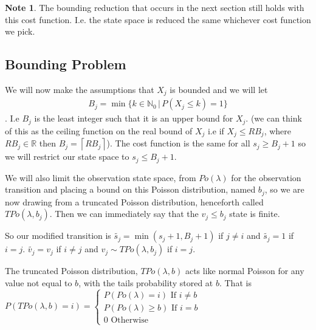 \documentclass[a4paper,10pt]{article}
\newcommand{\ceil}[1]{\left \lceil #1 \right \rceil}
\theoremstyle{definition}
\theoremstyle{definition}
\theoremstyle{remark}
\theoremstyle{definition}
\newtheorem*{note}{Note}
\begin{document}
\begin{note}
The bounding reduction that occurs in the next section still holds with this cost function. I.e. the state space is reduced the same whichever cost function we pick.
\end{note}

\subsection{Bounding Problem}
We will now make the assumptions that $X_{j}$ is bounded and we will let
\begin{align*}
B_{j}=\min \{k \in \mathbb{N}_{0} \, | \, P(X_{j} \leq k)=1 \}
\end{align*}.
I.e $B_{j}$ is the least integer such that it is an upper bound for $X_{j}$. (we can think of this as the ceiling function on the real bound of  $X_{j}$ i.e if $X_{j} \leq RB_{j}$, where $RB_{j} \in \mathbb{R}$ then $B_{j}=\ceil{RB_{j}}$).
The cost function is the same for all $s_{j} \geq B_{j}+1$ so we will restrict our state space to $s_{j} \leq B_{j}+1$.

We will also limit the observation state space, from $Po(\lambda)$ for the observation transition and placing a bound on this Poisson distribution, named $b_{j}$, so we are now drawing from a truncated Poisson distribution, henceforth called $TPo(\lambda,b_{j})$. Then we can immediately say that the $v_{j} \leq b_{j}$ state is finite.

So our modified transition is $\widetilde{s_{j}}=\min(s_{j}+1,B_{j}+1)$ if $j \neq i$ and $\widetilde{s_{j}}=1$ if $i=j$. $\widetilde{v_{j}}=v_{j}$ if $i \neq j$ and $v_{j} \sim TPo(\lambda,b_{j})$ if $i=j$.

The truncated Poisson distribution, $TPo(\lambda,b)$ acts like normal Poisson for any value not equal to $b$, with the tails probability stored at $b$. That is $P(TPo(\lambda,b)=i)=\begin{cases}
P(Po(\lambda)=i) \text{ If } i \neq b \\
P(Po(\lambda) \geq b) \text{ If } i=b \\
0 \text{ Otherwise}
\end{cases}$
\end{document}

